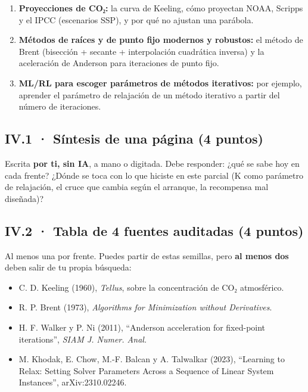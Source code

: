 \begin{enumerate}
\def\labelenumi{\arabic{enumi}.}
\tightlist
\item
  \textbf{Proyecciones de CO₂:} la curva de Keeling, cómo proyectan NOAA, Scripps y el IPCC (escenarios SSP), y por qué no ajustan una parábola.
\item
  \textbf{Métodos de raíces y de punto fijo modernos y robustos:} el método de Brent (bisección + secante + interpolación cuadrática inversa) y la aceleración de Anderson para iteraciones de punto fijo.
\item
  \textbf{ML/RL para escoger parámetros de métodos iterativos:} por ejemplo, aprender el parámetro de relajación de un método iterativo a partir del número de iteraciones.
\end{enumerate}

\subsection{IV.1 · Síntesis de una página (4 puntos)}

Escrita \textbf{por ti, sin IA}, a mano o digitada. Debe responder: ¿qué se sabe hoy en cada frente? ¿Dónde se toca con lo que hiciste en este parcial (K como parámetro de relajación, el cruce que cambia según el arranque, la recompensa mal diseñada)?

\subsection{IV.2 · Tabla de 4 fuentes auditadas (4 puntos)}

Al menos una por frente. Puedes partir de estas semillas, pero \textbf{al menos dos} deben salir de tu propia búsqueda:

\begin{itemize}
\tightlist
\item
  C. D. Keeling (1960), \emph{Tellus}, sobre la concentración de CO₂ atmosférico.
\item
  R. P. Brent (1973), \emph{Algorithms for Minimization without Derivatives}.
\item
  H. F. Walker y P. Ni (2011), ``Anderson acceleration for fixed-point iterations'', \emph{SIAM J. Numer. Anal.}
\item
  M. Khodak, E. Chow, M.-F. Balcan y A. Talwalkar (2023), ``Learning to Relax: Setting Solver Parameters Across a Sequence of Linear System Instances'', arXiv:2310.02246.
\end{itemize}

